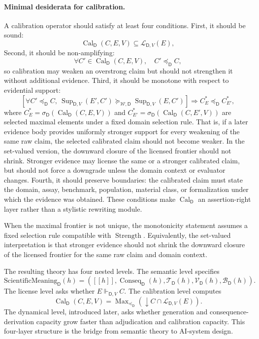 \documentclass[11pt,a4paper]{article}
\newcommand{\Conseq}{\operatorname{Conseq}}
\newcommand{\denote}[1]{\left[\!\left[#1\right]\!\right]}
\newcommand{\Strength}{\operatorname{Strength}}
\newcommand{\Cal}{\operatorname{Cal}}
\newcommand{\Sup}{\operatorname{Sup}}
\newcommand{\Max}{\operatorname{Max}}
\newcommand{\Dom}{\mathsf{D}}
\begin{document}
\paragraph{Minimal desiderata for calibration.}
A calibration operator should satisfy at least four conditions. First, it should be sound:
\begin{equation}
\Cal_{\Dom}(C,E,V)\subseteq \mathcal{L}_{\Dom,V}(E),
\end{equation}
Second, it should be non-amplifying:
\begin{equation}
\forall C'\in\Cal_{\Dom}(C,E,V),\quad C'\preceq_{\Dom} C,
\end{equation}
so calibration may weaken an overstrong claim but should not strengthen it without additional evidence. Third, it should be monotone with respect to evidential support:
\begin{equation}
\left[
\forall C'\preceq_{\Dom} C,\
\Sup_{\Dom,V}(E',C')\succeq_{\mathcal{W},\Dom}\Sup_{\Dom,V}(E,C')
\right]
\Rightarrow
C_E^\ast\preceq_{\Dom} C_{E'}^\ast,
\end{equation}
where $C_E^\ast=\sigma_{\Dom}(\Cal_{\Dom}(C,E,V))$ and $C_{E'}^\ast=\sigma_{\Dom}(\Cal_{\Dom}(C,E',V))$ are selected maximal elements under a fixed domain selection rule. That is, if a later evidence body provides uniformly stronger support for every weakening of the same raw claim, the selected calibrated claim should not become weaker. In the set-valued version, the downward closure of the licensed frontier should not shrink. Stronger evidence may license the same or a stronger calibrated claim, but should not force a downgrade unless the domain context or evaluator changes. Fourth, it should preserve boundaries: the calibrated claim must state the domain, assay, benchmark, population, material class, or formalization under which the evidence was obtained. These conditions make $\Cal_{\Dom}$ an assertion-right layer rather than a stylistic rewriting module.

When the maximal frontier is not unique, the monotonicity statement assumes a fixed selection rule compatible with $\Strength$. Equivalently, the set-valued interpretation is that stronger evidence should not shrink the downward closure of the licensed frontier for the same raw claim and domain context.

The resulting theory has four nested levels. The semantic level specifies
\[
\mathrm{ScientificMeaning}_{\Dom}(h)=
(\denote{h},\Conseq_{\Dom}(h),\mathcal{T}_{\Dom}(h),\mathcal{V}_{\Dom}(h),\mathcal{B}_{\Dom}(h)).
\]
The license level asks whether $E\Vdash_{\Dom,V} C$. The calibration level computes
\[
\Cal_{\Dom}(C,E,V)=\Max_{\preceq_{\Dom}}(\downarrow C\cap\mathcal{L}_{\Dom,V}(E)).
\]
The dynamical level, introduced later, asks whether generation and consequence-derivation capacity grow faster than adjudication and calibration capacity. This four-layer structure is the bridge from semantic theory to AI-system design.
\end{document}

